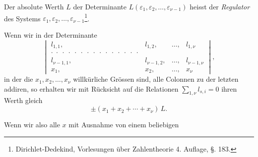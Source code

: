 \documentclass[12pt,a4paper]{article}
\begin{document}
Der absolute Werth $L$ der Determinante $L(\varepsilon_1, \varepsilon_2, \ldots, \varepsilon_{\nu-1})$ heisst der \emph{Regulator} des Systems $\varepsilon_1, \varepsilon_2, \ldots, \varepsilon_{\nu-1}$\footnote{Dirichlet-Dedekind, Vorlesungen über Zahlentheorie 4. Auflage, \S. 183.}.

Wenn wir in der Determinante
\begin{equation}\label{eq:186-4}
\begin{vmatrix}
l_{1,1}, & l_{1,2}, & \ldots, & l_{1,\nu}\\
\cdot\;\cdot\;\cdot\;\cdot\;\cdot\;\cdot\;\cdot\;\cdot\;\cdot\;\cdot\;\cdot\;\cdot\;\cdot\;\cdot\;\cdot\\
l_{\nu-1,1}, & l_{\nu-1,2}, & \ldots, & l_{\nu-1,\nu}\\
x_1, & x_2, & \ldots, & x_\nu
\end{vmatrix},
\end{equation}
in der die $x_1, x_2, \ldots, x_\nu$ willkürliche Grössen sind, alle Colonnen zu der letzten addiren, so erhalten wir mit Rücksicht auf die Relationen $\sum\limits_{1,\nu} l_{s,i} = 0$ ihren Werth gleich
\[
\pm(x_1 + x_2 + \cdots + x_\nu)\,L.
\]

Wenn wir also alle $x$ mit Ausnahme von einem beliebigen
\end{document}
